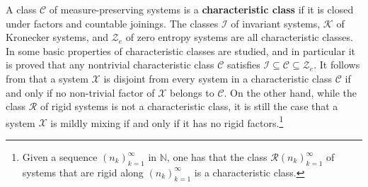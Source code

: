 \documentclass[graybox]{svmult}
\theoremstyle{definition}
\begin{document}
A class $\mathcal{C}$ of measure-preserving systems is a \textbf{characteristic class} if it is closed under factors and countable joinings.
The classes $\mathcal{I}$ of invariant systems, $\mathcal{K}$ of Kronecker systems, and $\mathcal{Z}_e$ of zero entropy systems are all characteristic classes.
In \cite{ArithmeticFunctionsOrthogonalToDeterminism} some basic properties of characteristic classes are studied, and in particular it is proved that any nontrivial characteristic class $\mathcal{C}$ satisfies $\mathcal{I} \subseteq \mathcal{C} \subseteq \mathcal{Z}_e$.
It follows from \cite[Proposition 2.2]{ArithmeticFunctionsOrthogonalToDeterminism} that a system $\mathcal{X}$ is disjoint from every system in a characteristic class $\mathcal{C}$ if and only if no non-trivial factor of $\mathcal{X}$ belongs to  $\mathcal{C}$.
On the other hand, while the class $\mathcal{R}$ of rigid systems is not a characteristic class, it is still the case that a system $\mathcal{X}$ is mildly mixing if and only if it has no rigid factors.\footnote{Given a sequence $(n_k)_{k = 1}^\infty$ in $\mathbb N$, one has that the class $\mathcal{R}(n_k)_{k = 1}^\infty$ of systems that are rigid along $(n_k)_{k = 1}^\infty$ is a characteristic class.}
\end{document}
